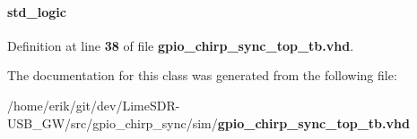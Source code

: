 \paragraph[{w\+\_\+testout}]{ {\bfseries \textcolor{comment}{std\+\_\+logic}\textcolor{vhdlchar}{ }} \hspace{0.3cm}{\ttfamily [Signal]}}\label{classgpio__chirp__sync__top__tb_1_1arch_aa6cf97e28bf583edf4a70c3781d57341}


Definition at line {\bf 38} of file {\bf gpio\+\_\+chirp\+\_\+sync\+\_\+top\+\_\+tb.\+vhd}.



The documentation for this class was generated from the following file\+:\begin{DoxyCompactItemize}
\item 
/home/erik/git/dev/\+Lime\+S\+D\+R-\/\+U\+S\+B\+\_\+\+G\+W/src/gpio\+\_\+chirp\+\_\+sync/sim/{\bf gpio\+\_\+chirp\+\_\+sync\+\_\+top\+\_\+tb.\+vhd}\end{DoxyCompactItemize}
